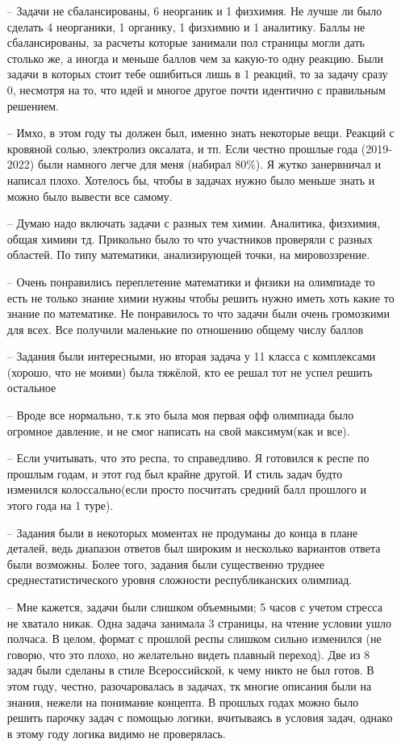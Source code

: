 \begin{itemize}
    \item[--] Задачи не сбалансированы, 6 неорганик и 1 физхимия. Не лучше ли было сделать 4 неорганики, 1 органику, 1 физхимию и 1 аналитику. Баллы не сбалансированы, за расчеты которые занимали пол страницы могли дать столько же, а иногда и меньше баллов чем за какую-то одну реакцию. Были задачи в которых стоит тебе ошибиться лишь в 1 реакций, то за задачу сразу 0, несмотря на то, что идей и многое другое почти идентично с правильным решением. 
    \item[--] Имхо, в этом году ты должен был, именно знать некоторые вещи. Реакций с кровяной солью, электролиз оксалата, и тп. Если честно прошлые года (2019-2022) были намного легче для меня (набирал 80\%). Я жутко занервничал и написал плохо. Хотелось бы, чтобы в задачах нужно было меньше знать и можно было вывести все самому.
    \item[--] Думаю надо включать задачи с разных тем химии. Аналитика, физхимия, общая химияи тд. Прикольно было то что участников проверяли с разных областей. По типу математики, анализирующей точки, на мировоззрение.
    \item[--] Очень понравились переплетение математики и физики на олимпиаде то есть не только знание химии нужны чтобы решить нужно иметь хоть какие то знание по математике. Не понравилось то что задачи были очень громозкими для всех. Все получили маленькие по отношению общему числу баллов
    \item[--] Задания были интересными, но вторая задача у 11 класса с комплексами (хорошо, что не моими) была тяжёлой, кто ее решал тот не успел решить остальное
    \item[--] Вроде все нормально, т.к это была моя первая офф олимпиада было огромное давление, и не смог написать на свой максимум(как и все).
    \item[--] Если учитывать, что это респа, то справедливо. Я готовился к респе по прошлым годам, и этот год был крайне другой. И стиль задач будто изменился колоссально(если просто посчитать средний балл прошлого и этого года на 1 туре). 
    \item[--] Задания были в некоторых моментах не продуманы до конца в плане деталей, ведь диапазон ответов был широким и несколько вариантов ответа были возможны. Более того, задания были существенно труднее среднестатистического уровня сложности республиканских олимпиад.
    \item[--] Мне кажется, задачи были слишком объемными; 5 часов с учетом стресса не хватало никак. Одна задача занимала 3 страницы, на чтение условии ушло полчаса. В целом, формат с прошлой респы слишком сильно изменился (не говорю, что это плохо, но желательно видеть плавный переход). Две из 8 задач были сделаны в стиле Всероссийской, к чему никто не был готов. В этом году, честно, разочаровалась в задачах, тк многие описания были на знания, нежели на понимание концепта. В прошлых годах можно было решить парочку задач с помощью логики, вчитываясь в условия задач, однако в этому году логика видимо не проверялась.

\end{itemize}
